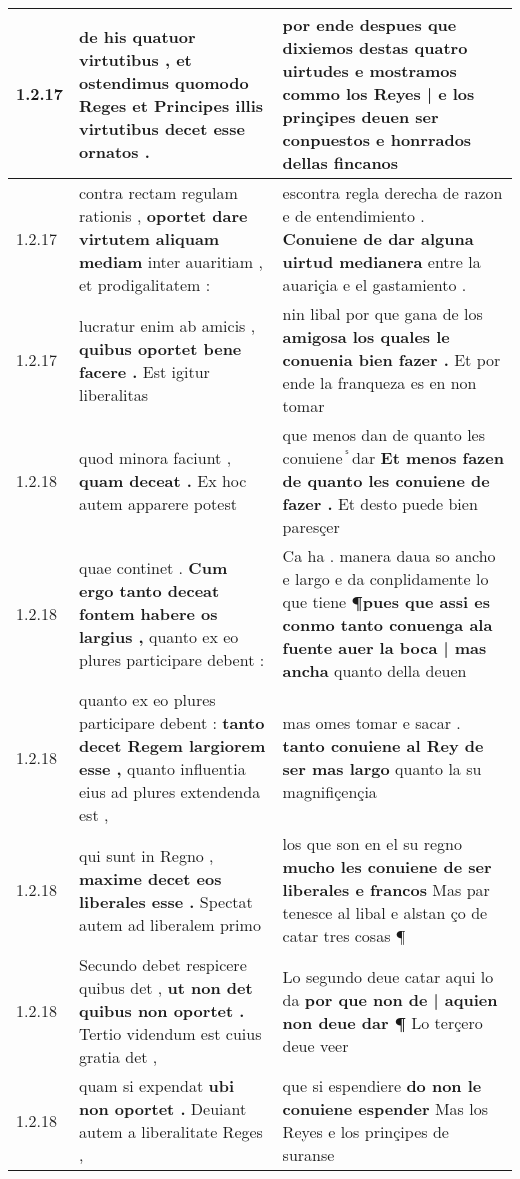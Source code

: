 \begin{tabular}{|p{1cm}|p{6.5cm}|p{6.5cm}|}
1.2.17 & de his quatuor virtutibus , \textbf{ et ostendimus quomodo Reges et Principes illis virtutibus decet } esse ornatos . & por ende despues que dixiemos destas quatro uirtudes \textbf{ e mostramos commo los Reyes | e los prinçipes deuen ser conpuestos e honrrados } dellas fincanos \\\hline
1.2.17 & contra rectam regulam rationis , \textbf{ oportet dare virtutem aliquam mediam } inter auaritiam , et prodigalitatem : & escontra regla derecha de razon e de entendimiento . \textbf{ Conuiene de dar alguna uirtud medianera } entre la auariçia e el gastamiento . \\\hline
1.2.17 & lucratur enim ab amicis , \textbf{ quibus oportet bene facere . } Est igitur liberalitas & nin libal por que gana de los \textbf{ amigosa los quales le conuenia bien fazer . } Et por ende la franqueza es en non tomar \\\hline
1.2.18 & quod minora faciunt , \textbf{ quam deceat . } Ex hoc autem apparere potest & que menos dan de quanto les conuiene ᷤ dar \textbf{ Et menos fazen de quanto les conuiene de fazer . } Et desto puede bien paresçer \\\hline
1.2.18 & quae continet . \textbf{ Cum ergo tanto deceat fontem habere os largius , } quanto ex eo plures participare debent : & Ca ha . manera daua so ancho e largo e da conplidamente lo que tiene \textbf{ ¶pues que assi es conmo tanto conuenga ala fuente auer la boca | mas ancha } quanto della deuen \\\hline
1.2.18 & quanto ex eo plures participare debent : \textbf{ tanto decet Regem largiorem esse , } quanto influentia eius ad plures extendenda est , & mas omes tomar e sacar . \textbf{ tanto conuiene al Rey de ser mas largo } quanto la su magnifiçençia \\\hline
1.2.18 & qui sunt in Regno , \textbf{ maxime decet eos liberales esse . } Spectat autem ad liberalem primo & los que son en el su regno \textbf{ mucho les conuiene de ser liberales e francos } Mas par tenesce al libal e alstan ço de catar tres cosas ¶ \\\hline
1.2.18 & Secundo debet respicere quibus det , \textbf{ ut non det quibus non oportet . } Tertio videndum est cuius gratia det , & Lo segundo deue catar aqui lo da \textbf{ por que non de | aquien non deue dar ¶ } Lo terçero deue veer \\\hline
1.2.18 & quam si expendat \textbf{ ubi non oportet . } Deuiant autem a liberalitate Reges , & que si espendiere \textbf{ do non le conuiene espender } Mas los Reyes e los prinçipes de suranse \\\hline

\end{tabular}
